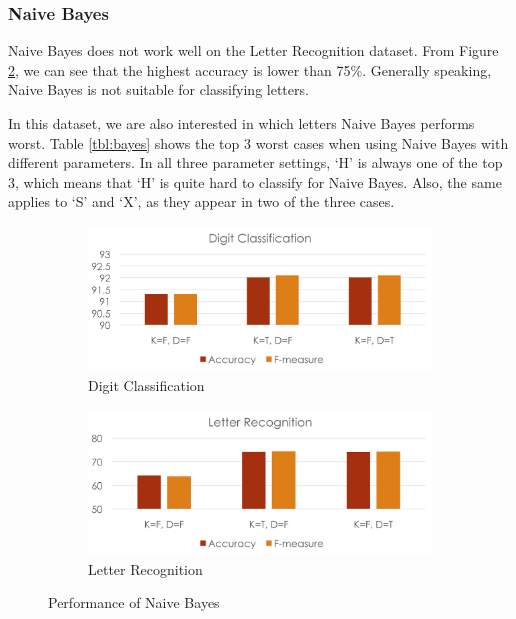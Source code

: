 \documentclass[11pt]{article}
\begin{document}
\subsubsection{Naive Bayes}
Naive Bayes does not work well on the Letter Recognition dataset. From Figure \ref{fig:letter-bayes}, we can see that the highest accuracy is lower than 75\%. Generally speaking, Naive Bayes is not suitable for classifying letters.

In this dataset, we are also interested in which letters Naive Bayes performs worst. Table \ref{tbl:bayes} shows the top 3 worst cases when using Naive Bayes with different parameters. In all three parameter settings, `H' is always one of the top 3, which means that `H' is quite hard to classify for Naive Bayes. Also, the same applies to `S' and `X', as they appear in two of the three cases.






\begin{figure}[htbp]
\centering

\begin{subfigure}[htbp]{0.46\columnwidth}
\includegraphics*[width=\textwidth]{fig/digit_bayes}
\caption{Digit Classification}
\label{fig:digit-bayes}
\end{subfigure}
\hfill
\begin{subfigure}[htbp]{0.46\columnwidth}
\includegraphics*[width=\textwidth]{fig/letter_bayes}
\caption{Letter Recognition}
\label{fig:letter-bayes}
\end{subfigure}
\caption{Performance of Naive Bayes}
\label{fig:bayes}
\end{figure}
\end{document}
